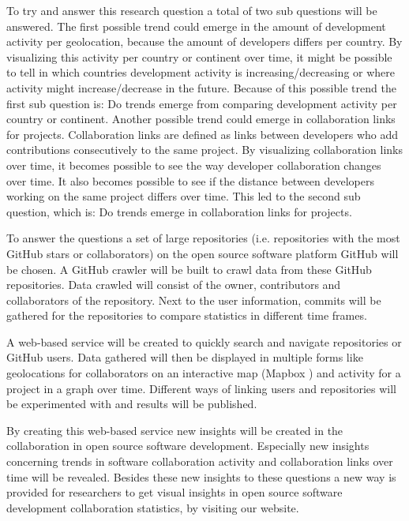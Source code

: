 \documentclass[acmtog, authorversion]{acmart}
\begin{document}
To try and answer this research question a total of two sub questions will be answered. The first possible trend could emerge in the amount of development activity per geolocation, because the amount of developers differs per country. 
By visualizing this activity per country or continent over time, it might be possible to tell in which countries development activity is increasing/decreasing or where activity might increase/decrease in the future. 
Because of this possible trend the first sub question is: Do trends emerge from comparing development activity per country or continent. 
Another possible trend could emerge in collaboration links for projects. 
Collaboration links are defined as links between developers who add contributions consecutively to the same project. 
By visualizing collaboration links over time, it becomes possible to see the way developer collaboration changes over time. 
It also becomes possible to see if the distance between developers working on the same project differs over time. 
This led to the second sub question, which is: Do trends emerge in collaboration links for projects.  

To answer the questions a set of large repositories (i.e. repositories with the most GitHub stars or collaborators) on the open source software platform GitHub will be chosen.
A GitHub crawler will be built to crawl data from these GitHub repositories. 
Data crawled will consist of the owner, contributors and collaborators of the repository. Next to the user information, commits will be gathered for the repositories to compare statistics in different time frames.
 
A web-based service will be created to quickly search and navigate repositories or GitHub users.
Data gathered will then be displayed in multiple forms like geolocations for collaborators on an interactive map (Mapbox \cite{MapBox}) and activity for a project in a graph over time. 
Different ways of linking users and repositories will be experimented with and results will be published.

By creating this web-based service new insights will be created in the collaboration in open source software development. 
Especially new insights concerning trends in software collaboration activity and collaboration links over time will be revealed. 
Besides these new insights to these questions a new way is provided for researchers to get visual insights in open source software development collaboration statistics, by visiting our website.



\end{document}
